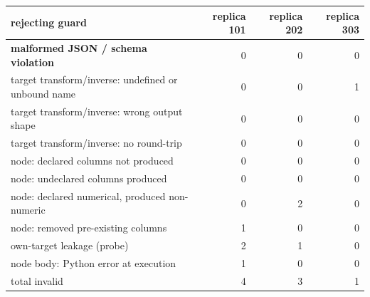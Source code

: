 \begin{tabular}{lrrr}
\toprule
rejecting guard & replica 101 & replica 202 & replica 303 \\
\midrule
\textbf{malformed JSON / schema violation} & 0 & 0 & 0 \\
target transform/inverse: undefined or unbound name & 0 & 0 & 1 \\
target transform/inverse: wrong output shape & 0 & 0 & 0 \\
target transform/inverse: no round-trip & 0 & 0 & 0 \\
node: declared columns not produced & 0 & 0 & 0 \\
node: undeclared columns produced & 0 & 0 & 0 \\
node: declared numerical, produced non-numeric & 0 & 2 & 0 \\
node: removed pre-existing columns & 1 & 0 & 0 \\
own-target leakage (probe) & 2 & 1 & 0 \\
node body: Python error at execution & 1 & 0 & 0 \\
\midrule
total invalid & 4 & 3 & 1 \\
\bottomrule
\end{tabular}
